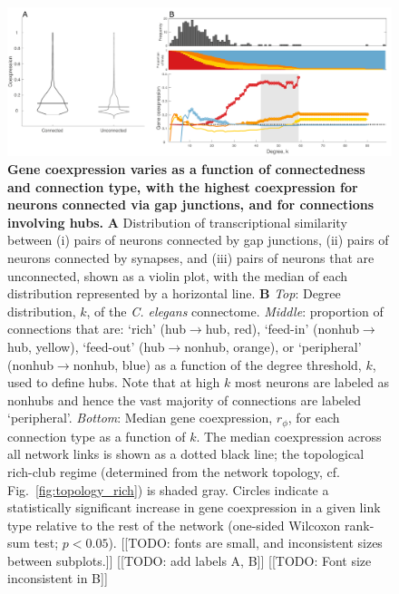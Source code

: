\documentclass[10pt,letterpaper]{article}
\begin{document}
 \begin{figure}[h]
 \centering
    \includegraphics[width=1\textwidth]{MeanCoexpression2.pdf}
\caption{{\bf Gene coexpression varies as a function of connectedness and connection type, with the highest coexpression for neurons connected via gap junctions, and for connections involving hubs.}
\textbf{A} Distribution of transcriptional similarity between (i) pairs of neurons connected by gap junctions, (ii) pairs of neurons connected by synapses, and (iii) pairs of neurons that are unconnected, shown as a violin plot, with the median of each distribution represented by a horizontal line.
\textbf{B}
\emph{Top}: Degree distribution, $k$, of the \emph{C. elegans} connectome.
\emph{Middle}: proportion of connections that are:
`rich' (hub$\rightarrow$hub, red),
`feed-in' (nonhub$\rightarrow$hub, yellow),
`feed-out' (hub$\rightarrow$nonhub, orange), or
`peripheral' (nonhub$\rightarrow$nonhub, blue) as a function of the degree threshold, $k$, used to define hubs.
Note that at high $k$ most neurons are labeled as nonhubs and hence the vast majority of connections are labeled `peripheral'.
 \emph{Bottom}: Median gene coexpression, $r_\phi$, for each connection type as a function of $k$.
 The median coexpression across all network links is shown as a dotted black line; the topological rich-club regime (determined from the network topology, cf. Fig.~\ref{fig:topology_rich}) is shaded gray.
Circles indicate a statistically significant increase in gene coexpression in a given link type relative to the rest of the network (one-sided Wilcoxon rank-sum test;  $p<0.05$).
[[TODO: fonts are small, and inconsistent sizes between subplots.]]
[[TODO: add labels A, B]]
[[TODO: Font size inconsistent in B]]
}

 \label{fig:coExp}
\end{figure}
\end{document}
